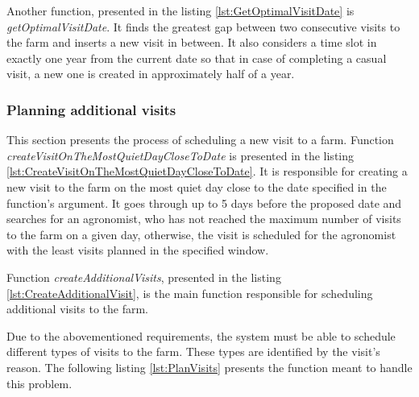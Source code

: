 

Another function, presented in the listing \ref{lst:GetOptimalVisitDate} is \textit{getOptimalVisitDate}. It finds the greatest gap between two consecutive visits to the farm and inserts a new visit in between. It also considers a time slot in exactly one year from the current date so that in case of completing a casual visit, a new one is created in approximately half of a year.



\subsubsection*{Planning additional visits}

This section presents the process of scheduling a new visit to a farm. Function \textit{createVisitOnTheMostQuietDayCloseToDate} is presented in the listing \ref{lst:CreateVisitOnTheMostQuietDayCloseToDate}. It is responsible for creating a new visit to the farm on the most quiet day close to the date specified in the function's argument. It goes through up to 5 days before the proposed date and searches for an agronomist, who has not reached the maximum number of visits to the farm on a given day, otherwise, the visit is scheduled for the agronomist with the least visits planned in the specified window.



Function \textit{createAdditionalVisits}, presented in the listing \ref{lst:CreateAdditionalVisit}, is the main function responsible for scheduling additional visits to the farm.



Due to the abovementioned requirements, the system must be able to schedule different types of visits to the farm. These types are identified by the visit's reason. The following listing \ref{lst:PlanVisits} presents the function meant to handle this problem.

